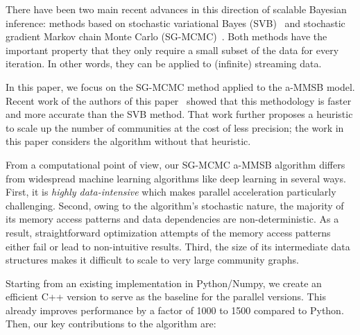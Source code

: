 There have been two main recent advances in this direction of scalable Bayesian inference: methods based on stochastic variational Bayes (SVB)~\cite{gopalan2012scalable,hoffman2013stochastic,gopalan2013efficient} and stochastic gradient Markov chain Monte Carlo (SG-MCMC)~\cite{welling2011bayesian,patterson2013stochastic,ahn2014distributed,ahn2012bayesian}. Both methods have the important property that they only require a small subset of the data for every iteration. In other words, they can be applied to (infinite) streaming data.

In this paper, we focus on the SG-MCMC method applied to the a-MMSB model. Recent
work of the authors of this paper~\cite{LiAW15} showed that this methodology is faster and more accurate than the
SVB method. That work further proposes a heuristic to scale up the number of
communities at the cost of less precision; the work in this paper considers the
algorithm without that heuristic.

From a computational point of view, our SG-MCMC a-MMSB algorithm differs
from widespread machine learning algorithms like deep learning in several
ways. First, it is \emph{highly data-intensive} which makes parallel acceleration
particularly challenging. Second, owing to the algorithm's stochastic
nature, the majority of its memory access patterns and data dependencies
are non-deterministic. As a result, straightforward optimization attempts
of the memory access patterns either fail or lead to non-intuitive results. Third,
the size of its intermediate data structures makes it difficult to scale to very large
community graphs.

Starting from an existing implementation in Python/Numpy, we create an efficient
C++ version to serve as the baseline for the parallel versions.
This already improves performance by a factor of 1000 to 1500 compared to
Python.
Then, our key contributions to the algorithm are:

